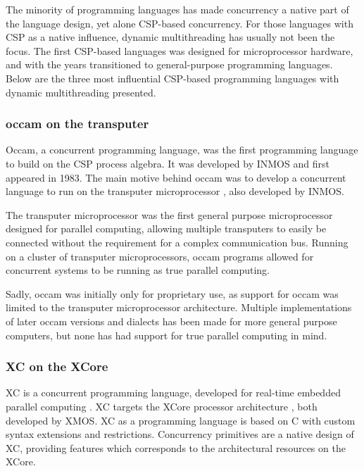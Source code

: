 The minority of programming languages has made concurrency a native part of the language design, yet alone CSP\hyp{}based concurrency. For those languages with CSP as a native influence, dynamic multithreading has usually not been the focus. The first CSP\hyp{}based languages was designed for microprocessor hardware, and with the years transitioned to general\hyp{}purpose programming languages. Below are the three most influential CSP\hyp{}based programming languages with dynamic multithreading presented.


\subsubsection{occam on the transputer}


Occam, a concurrent programming language, was the first programming language to build on the CSP process algebra. It was developed by INMOS \citep{may1983occam} and first appeared in 1983. The main motive behind occam was to develop a concurrent language to run on the transputer microprocessor \citep{may1984occam}, also developed by INMOS.

The transputer microprocessor was the first general purpose microprocessor designed for parallel computing, allowing multiple transputers to easily be connected without the requirement for a complex communication bus. Running on a cluster of transputer microprocessors, occam programs allowed for concurrent systems to be running as true parallel computing.

Sadly, occam was initially only for proprietary use, as support for occam was limited to the transputer microprocessor architecture. Multiple implementations of later occam versions and dialects has been made for more general purpose computers, but none has had support for true parallel computing in mind.


\subsubsection{XC on the XCore}


XC is a concurrent programming language, developed for real\hyp{}time embedded parallel computing \citep{watt2009programming}. XC targets the XCore processor architecture \citep{may2009xmos}, both developed by XMOS. XC as a programming language is based on C with custom syntax extensions and restrictions. Concurrency primitives are a native design of XC, providing features which corresponds to the architectural resources on the XCore.

